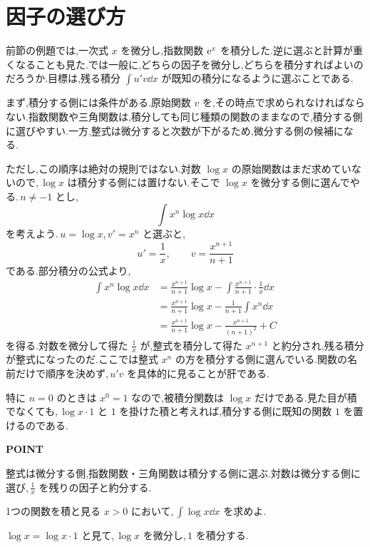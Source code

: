 \section{因子の選び方}\label{節:部分積分の因子選択}

前節の例題では,一次式 $x$ を微分し,指数関数 $\mathrm{e}^x$ を積分した.逆に選ぶと計算が重くなることも見た.では一般に,どちらの因子を微分し,どちらを積分すればよいのだろうか.目標は,残る積分 $\int u'v\dd x$ が既知の積分になるように選ぶことである.

まず,積分する側には条件がある.原始関数 $v$ を,その時点で求められなければならない.指数関数や三角関数は,積分しても同じ種類の関数のままなので,積分する側に選びやすい.一方,整式は微分すると次数が下がるため,微分する側の候補になる.

ただし,この順序は絶対の規則ではない.対数 $\log x$ の原始関数はまだ求めていないので,\,$\log x$ は積分する側には置けない.そこで $\log x$ を微分する側に選んでやる.\,$n\neq-1$ とし,
\[
 \int x^n\log x\dd x
\]
を考えよう.\,$u=\log x$,\,$v'=x^n$ と選ぶと,
\[
 u'=\frac1x,\qquad v=\frac{x^{n+1}}{n+1}
\]
である.部分積分の公式より,
\[
\begin{aligned}
 \int x^n\log x\dd x
 &=\frac{x^{n+1}}{n+1}\log x-\int\frac{x^{n+1}}{n+1}\cdot\frac1x\dd x\\
 &=\frac{x^{n+1}}{n+1}\log x-\frac{1}{n+1}\int x^n\dd x\\
 &=\frac{x^{n+1}}{n+1}\log x-\frac{x^{n+1}}{(n+1)^2}+C
\end{aligned}
\]
を得る.対数を微分して得た $\frac1x$ が,整式を積分して得た $x^{n+1}$ と約分され,残る積分が整式になったのだ.ここでは整式 $x^n$ の方を積分する側に選んでいる.関数の名前だけで順序を決めず,\,$u'v$ を具体的に見ることが肝である.

特に $n=0$ のときは $x^0=1$ なので,被積分関数は $\log x$ だけである.見た目が積でなくても,\,$\log x\cdot1$ と $1$ を掛けた積と考えれば,積分する側に既知の関数 $1$ を置けるのである.

\begin{bookpoint}
\textbf{POINT}\par
整式は微分する側,指数関数・三角関数は積分する側に選ぶ.対数は微分する側に選び,\,$\frac1x$ を残りの因子と約分する.
\end{bookpoint}

\begin{example}{1つの関数を積と見る}
$x>0$ において,\,$\int\log x\dd x$ を求めよ.
\end{example}

$\log x=\log x\cdot1$ と見て,\,$\log x$ を微分し,\,$1$ を積分する.

